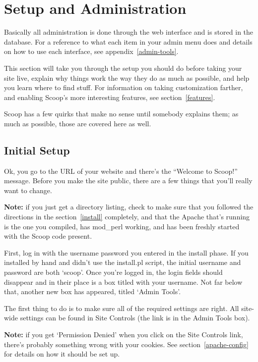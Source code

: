 \section{Setup and Administration}
\label{admin}

Basically all administration is done through the web interface and is stored in the database.  For a reference to what each item in your admin menu does and details on how to use each interface, see appendix~\ref{admin-tools}.

This section will take you through the setup you should do before taking your site live, explain why things work the way they do as much as possible, and help you learn where to find stuff.  For information on taking customization farther, and enabling Scoop's more interesting features, see section~\ref{features}.

Scoop has a few quirks that make no sense until somebody explains them; as much as possible, those are covered here as well.

\subsection{Initial Setup}
\label{initial-setup}

Ok, you go to the URL of your website and there's the ``Welcome to Scoop!'' message.  Before you make the site public, there are a few things that you'll really want to change.

{\bf Note:} if you just get a directory listing, check to make sure that you followed the directions in the section~\ref{install} completely, and that the Apache that's running is the one you compiled, has mod\_perl working, and has been freshly started with the Scoop code present.

First, log in with the username password you entered in the install phase.  If you installed by hand and didn't use the install.pl script, the initial username and password are both `scoop'.  Once you're logged in, the login fields should disappear and in their place is a box titled with your username.  Not far below that, another new box has appeared, titled `Admin Tools'.

The first thing to do is to make sure all of the required settings are right.  All site-wide settings can be found in Site Controls (the link is in the Admin Tools box).

{\bf Note:} if you get `Permission Denied' when you click on the Site Controls link, there's probably something wrong with your cookies.  See section~\ref{apache-config} for details on how it should be set up.


